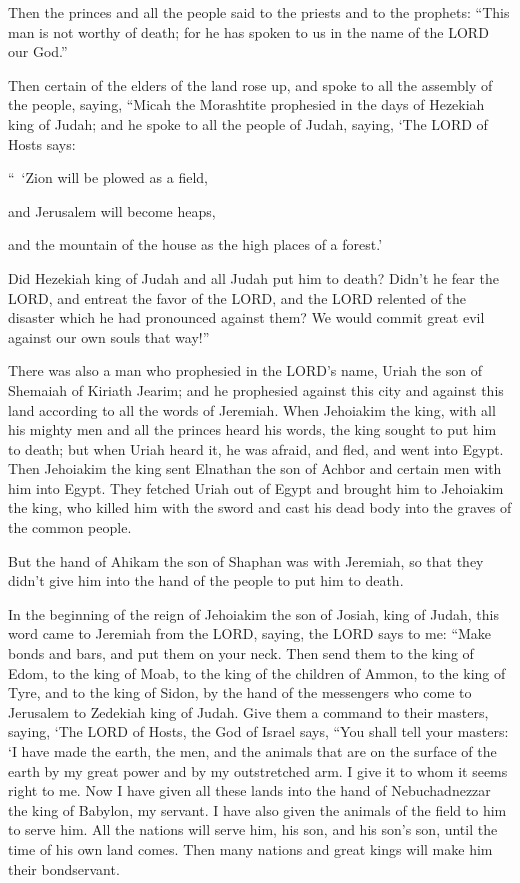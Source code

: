 \myverse{}Then the princes and all the people said to the priests and to the prophets: “This man is not worthy of death; for he has spoken to us in the name of the LORD our God.”


\myverse{}Then certain of the elders of the land rose up, and spoke to all the assembly of the people, saying, \myverse{}“Micah the Morashtite prophesied in the days of Hezekiah king of Judah; and he spoke to all the people of Judah, saying, ‘The LORD of Hosts says:

“ ‘Zion will be plowed as a field,

and Jerusalem will become heaps,

and the mountain of the house as the high places of a forest.’


\myverse{}Did Hezekiah king of Judah and all Judah put him to death? Didn’t he fear the LORD, and entreat the favor of the LORD, and the LORD relented of the disaster which he had pronounced against them? We would commit great evil against our own souls that way!”


\myverse{}There was also a man who prophesied in the LORD’s name, Uriah the son of Shemaiah of Kiriath Jearim; and he prophesied against this city and against this land according to all the words of Jeremiah. \myverse{}When Jehoiakim the king, with all his mighty men and all the princes heard his words, the king sought to put him to death; but when Uriah heard it, he was afraid, and fled, and went into Egypt. \myverse{}Then Jehoiakim the king sent Elnathan the son of Achbor and certain men with him into Egypt. \myverse{}They fetched Uriah out of Egypt and brought him to Jehoiakim the king, who killed him with the sword and cast his dead body into the graves of the common people.


\myverse{}But the hand of Ahikam the son of Shaphan was with Jeremiah, so that they didn’t give him into the hand of the people to put him to death.


\mychapter{} \myverse*{}In the beginning of the reign of Jehoiakim the son of Josiah,
king of Judah, this word came to Jeremiah from the LORD, saying, \myverse{}the LORD says to me: “Make bonds and bars, and put them on your neck. \myverse{}Then send them to the king of Edom, to the king of Moab, to the king of the children of Ammon, to the king of Tyre, and to the king of Sidon, by the hand of the messengers who come to Jerusalem to Zedekiah king of Judah. \myverse{}Give them a command to their masters, saying, ‘The LORD of Hosts, the God of Israel says, “You shall tell your masters: \myverse{}‘I have made the earth, the men, and the animals that are on the surface of the earth by my great power and by my outstretched arm. I give it to whom it seems right to me. \myverse{}Now I have given all these lands into the hand of Nebuchadnezzar the king of Babylon, my servant. I have also given the animals of the field to him to serve him. \myverse{}All the nations will serve him, his son, and his son’s son, until the time of his own land comes. Then many nations and great kings will make him their bondservant.


